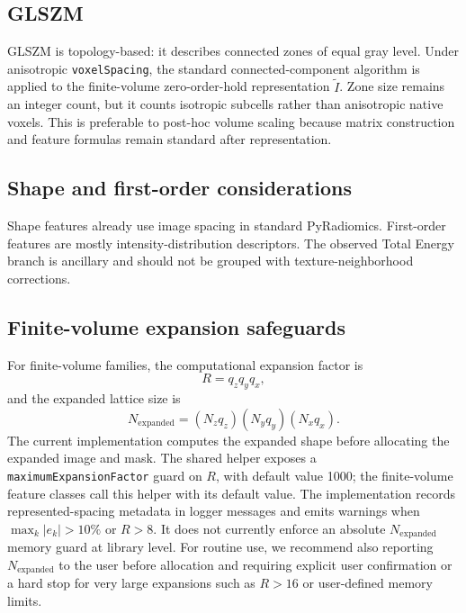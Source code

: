 \documentclass[11pt]{article}
\begin{document}
\subsection{GLSZM}
GLSZM is topology-based: it describes connected zones of equal gray level. Under anisotropic \texttt{voxelSpacing}, the standard connected-component algorithm is applied to the finite-volume zero-order-hold representation \(\tilde I\). Zone size remains an integer count, but it counts isotropic subcells rather than anisotropic native voxels. This is preferable to post-hoc volume scaling because matrix construction and feature formulas remain standard after representation.

\subsection{Shape and first-order considerations}
Shape features already use image spacing in standard PyRadiomics. First-order features are mostly intensity-distribution descriptors. The observed Total Energy branch is ancillary and should not be grouped with texture-neighborhood corrections.

\subsection{Finite-volume expansion safeguards}
For finite-volume families, the computational expansion factor is
\begin{equation}
R=q_zq_yq_x,
\end{equation}
and the expanded lattice size is
\begin{equation}
N_{\mathrm{expanded}}=(N_zq_z)(N_yq_y)(N_xq_x).
\end{equation}
The current implementation computes the expanded shape before allocating the expanded image and mask. The shared helper exposes a \texttt{maximumExpansionFactor} guard on \(R\), with default value 1000; the finite-volume feature classes call this helper with its default value. The implementation records represented-spacing metadata in logger messages and emits warnings when \(\max_k |e_k|>10\%\) or \(R>8\). It does not currently enforce an absolute \(N_{\mathrm{expanded}}\) memory guard at library level. For routine use, we recommend also reporting \(N_{\mathrm{expanded}}\) to the user before allocation and requiring explicit user confirmation or a hard stop for very large expansions such as \(R>16\) or user-defined memory limits.
\end{document}
